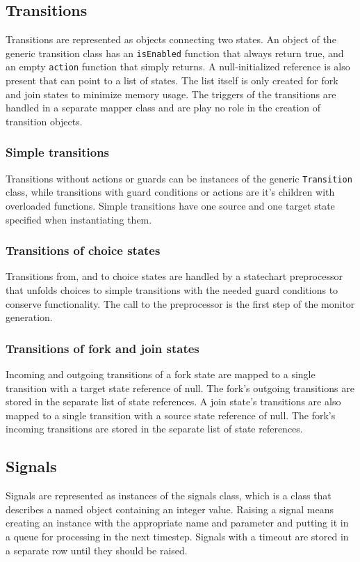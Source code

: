 {  \subsection{Transitions}
Transitions are represented as objects connecting two states. An object of the generic transition class has an \verb!isEnabled! function that always return true, and an empty \verb!action! function that simply returns. A null-initialized reference is also present that can point to a list of states. The list itself is only created for fork and join states to minimize memory usage. The triggers of the transitions are handled in a separate mapper class and are play no role in the creation of transition objects.
    \subsubsection{Simple transitions}
Transitions without actions or guards can be instances of the generic \verb!Transition! class, while transitions with guard conditions or actions are it's children with overloaded functions. Simple transitions have one source and one target state specified when instantiating them.
    \subsubsection{Transitions of choice states}
Transitions from, and to choice states are handled by a statechart preprocessor that unfolds choices to simple transitions with the needed guard conditions to conserve functionality. The call to the preprocessor is the first step of the monitor generation.
    \subsubsection{Transitions of fork and join states}
Incoming and outgoing transitions of a fork state are mapped to a single transition with a target state reference of null. The fork's outgoing transitions are stored in the separate list of state references. A join state's transitions are also mapped to a single transition with a source state reference of null. The fork's incoming transitions are stored in the separate list of state references.
  \subsection{Signals}
Signals are represented as instances of the signals class, which is a class that describes a named object containing an integer value. Raising a signal means creating an instance with the appropriate name and parameter and putting it in a queue for processing in the next timestep. Signals with a timeout are stored in a separate row until they should be raised.
}
